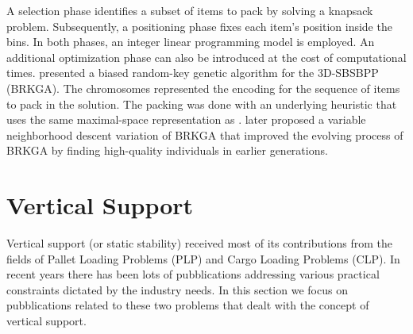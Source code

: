 A selection phase identifies a subset of items to pack by solving a knapsack problem. Subsequently, a positioning phase fixes each item's position inside the bins.
In both phases, an integer linear programming model is employed. An additional optimization phase can also be introduced at the cost of computational times.
\cite{gonccalves2013biased} presented a biased random-key genetic algorithm for the 3D-SBSBPP (BRKGA).
The chromosomes represented the encoding for the sequence of items to pack in the solution.
The packing was done with an underlying heuristic that uses the same maximal-space representation as \cite{parreno2010hybrid}.
\cite{zudio2018brkga} later proposed a variable neighborhood descent variation of BRKGA that improved the evolving process of BRKGA by finding high-quality individuals in earlier generations.


\section{Vertical Support}
\label{sec:literature:support}%
Vertical support (or static stability) received most of its contributions from the fields of Pallet Loading Problems (PLP) and Cargo Loading Problems (CLP).
In recent years there has been lots of pubblications addressing various practical constraints dictated by the industry needs.
In this section we focus on pubblications related to these two problems that dealt with the concept of vertical support.


